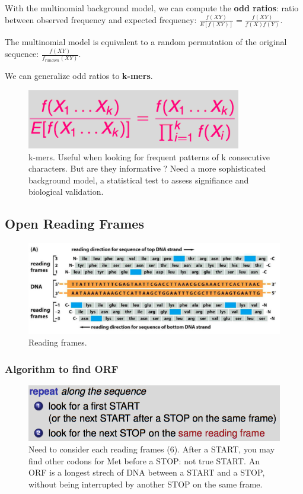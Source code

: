 With the multinomial background model, we can compute the \textbf{odd ratios}: ratio between observed frequency and expected frequency: $\frac{f(XY)}{E[f(XY)]} = \frac{f(XY)}{f(X)f(Y)}$.


The multinomial model is  equivalent to a random permutation of the original sequence: $\frac{f(XY)}{f_{random}(XY)}$.

We can generalize odd ratios to \textbf{k-mers}.

\begin{figure}[htp]
	\centering
	\includegraphics[scale=0.4]{images/03_kmers.png}
 	\caption{k-mers. Useful when looking for frequent patterns of k consecutive characters. But are they informative ? Need a more sophisticated background model, a statistical test to assess signifiance and biological validation.}
\end{figure}

\subsection{Open Reading Frames}

\begin{figure}[htp]
	\centering
	\includegraphics[scale=0.6]{images/04_rf.png}
 	\caption{Reading frames.}
\end{figure}

\subsubsection{Algorithm to find ORF}

\begin{figure}[H]
	\centering
	\includegraphics[scale=0.4]{images/05_algo.png}
 	\caption{Need to consider each reading frames (6). After a START, you may find other codons for Met before a STOP: not true START.   An ORF is a longest strech of DNA between a START and a STOP, without being interrupted by another STOP on the same frame.}
\end{figure}

